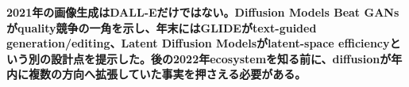 \noindent\textbf{2021年の画像生成はDALL-Eだけではない。Diffusion Models Beat GANsがquality競争の一角を示し、年末にはGLIDEがtext-guided generation/editing、Latent Diffusion Modelsがlatent-space efficiencyという別の設計点を提示した。後の2022年ecosystemを知る前に、diffusionが年内に複数の方向へ拡張していた事実を押さえる必要がある。}\autocite{src-11a149a699a0,src-50244427230b,src-a4561c635fe6}
